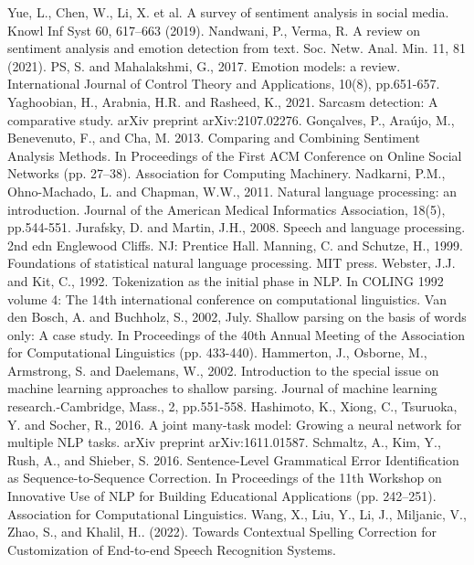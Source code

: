 \documentclass[12pt, conference]{IEEEtran}
\begin{document}
\begin{thebibliography}{00}
   Yue, L., Chen, W., Li, X. et al. A survey of sentiment analysis in social media. Knowl Inf Syst 60, 617–663 (2019).
   Nandwani, P., Verma, R. A review on sentiment analysis and emotion detection from text. Soc. Netw. Anal. Min. 11, 81 (2021).
   PS, S. and Mahalakshmi, G., 2017. Emotion models: a review. International Journal of Control Theory and Applications, 10(8), pp.651-657.
   Yaghoobian, H., Arabnia, H.R. and Rasheed, K., 2021. Sarcasm detection: A comparative study. arXiv preprint arXiv:2107.02276.
   Gonçalves, P., Araújo, M., Benevenuto, F., and Cha, M. 2013. Comparing and Combining Sentiment Analysis Methods. In Proceedings of the First ACM Conference on Online Social Networks (pp. 27–38). Association for Computing Machinery.
   Nadkarni, P.M., Ohno-Machado, L. and Chapman, W.W., 2011. Natural language processing: an introduction. Journal of the American Medical Informatics Association, 18(5), pp.544-551.
   Jurafsky, D. and Martin, J.H., 2008. Speech and language processing. 2nd edn Englewood Cliffs. NJ: Prentice Hall.
   Manning, C. and Schutze, H., 1999. Foundations of statistical natural language processing. MIT press.
   Webster, J.J. and Kit, C., 1992. Tokenization as the initial phase in NLP. In COLING 1992 volume 4: The 14th international conference on computational linguistics.
   Van den Bosch, A. and Buchholz, S., 2002, July. Shallow parsing on the basis of words only: A case study. In Proceedings of the 40th Annual Meeting of the Association for Computational Linguistics (pp. 433-440).
   Hammerton, J., Osborne, M., Armstrong, S. and Daelemans, W., 2002. Introduction to the special issue on machine learning approaches to shallow parsing. Journal of machine learning research.-Cambridge, Mass., 2, pp.551-558.
   Hashimoto, K., Xiong, C., Tsuruoka, Y. and Socher, R., 2016. A joint many-task model: Growing a neural network for multiple NLP tasks. arXiv preprint arXiv:1611.01587.
   Schmaltz, A., Kim, Y., Rush, A., and Shieber, S. 2016. Sentence-Level Grammatical Error Identification as Sequence-to-Sequence Correction. In Proceedings of the 11th Workshop on Innovative Use of NLP for Building Educational Applications (pp. 242–251). Association for Computational Linguistics.
   Wang, X., Liu, Y., Li, J., Miljanic, V., Zhao, S., and Khalil, H.. (2022). Towards Contextual Spelling Correction for Customization of End-to-end Speech Recognition Systems.

\end{thebibliography}
\end{document}
